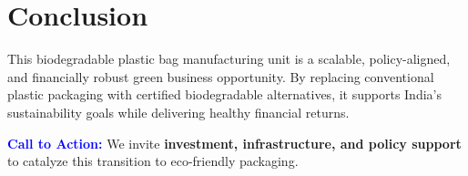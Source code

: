 \section*{Conclusion}

This biodegradable plastic bag manufacturing unit is a scalable, policy-aligned, and financially robust green business opportunity. By replacing conventional plastic packaging with certified biodegradable alternatives, it supports India’s sustainability goals while delivering healthy financial returns.

\vspace{0.5cm}

\noindent\textbf{\textcolor{blue}{\large Call to Action:}} We invite \textbf{investment, infrastructure, and policy support} to catalyze this transition to eco-friendly packaging.
